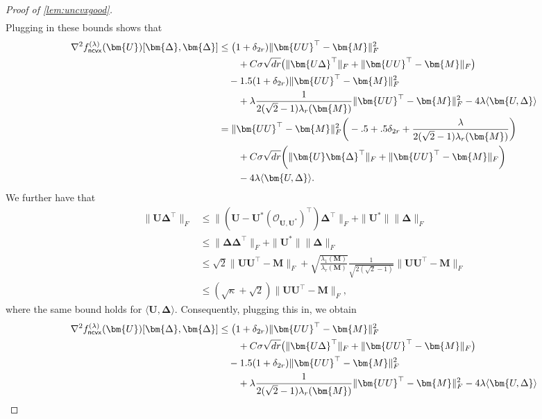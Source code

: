 \documentclass[10pt]{article}
\newcommand{\s}{^*}
\renewcommand{\t}{^{\top}}
\theoremstyle{definition}
\begin{document}
\begin{proof}[Proof of \cref{lem:uncvxgood}]
\begin{align}
     \end{align}
     Plugging in these bounds shows that
    \begin{align}
     \nabla^2 f^{(\lambda)}_{{\sf ncvx}}(\bm{U})[ \bm{\Delta},\bm{\Delta}] & \leq \big( 1 + \delta_{2r}) \| \bm{UU}\t - \bm{M} \|_F^2 \\
     &\qquad + C \sigma \sqrt{dr} \big( \| \bm{U\Delta}\t \|_F + \| \bm{UU}\t - \bm{M} \|_F \big) \\
     &\quad - 1.5( 1 + \delta_{2r}) \| \bm{UU}\t - \bm{M} \|_F^2 \\
     &\qquad + \lambda \frac{1}{2(\sqrt{2} - 1) \lambda_r(\bm{M})} \| \bm{UU}\t - \bm{M} \|_F^2 - 4 \lambda \langle \bm{U,\Delta} \rangle \\
     &= \| \bm{UU}\t - \bm{M} \|_F^2 \bigg( - .5 + .5 \delta_{2r} + \frac{\lambda}{2 (\sqrt{2} - 1) \lambda_r(\bm{M})} \bigg)  \\
     &\qquad + C \sigma \sqrt{dr} \bigg( \| \bm{U}\bm{\Delta}\t \|_F + \| \bm{UU}\t - \bm{M} \|_F\bigg) \\
     &\qquad - 4 \lambda \langle \bm{U,\Delta} \rangle.
     \end{align}
     We further have that
     \begin{align}
         \| \bm{U\Delta}\t \|_F &\leq \| ( \bm{U} - \bm{U}\s (\mathcal{O}_{\bm{U},\bm{U}\s})\t) \bm{\Delta}\t \|_F + \| \bm{U}\s \| \| \bm{\Delta} \|_F \\
         &\leq \| \bm{\Delta\Delta}\t \|_F +  \| \bm{U}\s \| \| \bm{\Delta} \|_F \\
         &\leq \sqrt{2} \| \bm{UU}\t - \bm{M} \|_F + \sqrt{\frac{\lambda_1(\bm{M})}{\lambda_r(\bm{M})}} \frac{1}{\sqrt{2(\sqrt{2}-1)}} \| \bm{UU}\t - \bm{M} \|_F \\
         &\leq (\sqrt{\kappa} + \sqrt{2}) \| \bm{UU}\t - \bm{M} \|_F,
     \end{align}
     where the same bound holds for $\langle \bm{U},\bm{\Delta} \rangle$.  Consequently, plugging this in, we obtain
    \begin{align}
     \nabla^2 f^{(\lambda)}_{{\sf ncvx}}(\bm{U})[ \bm{\Delta},\bm{\Delta}] & \leq \big( 1 + \delta_{2r}) \| \bm{UU}\t - \bm{M} \|_F^2 \\
     &\qquad + C \sigma \sqrt{dr} \big( \| \bm{U\Delta}\t \|_F + \| \bm{UU}\t - \bm{M} \|_F \big) \\
     &\quad - 1.5( 1 + \delta_{2r}) \| \bm{UU}\t - \bm{M} \|_F^2 \\
     &\qquad + \lambda \frac{1}{2(\sqrt{2} - 1) \lambda_r(\bm{M})} \| \bm{UU}\t - \bm{M} \|_F^2 - 4 \lambda \langle \bm{U,\Delta} \rangle \\

\end{align}
\end{proof}
\end{document}
